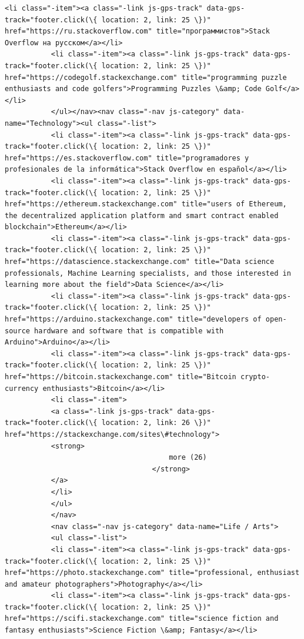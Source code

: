\documentclass[11pt]{article}
\begin{document}
\begin{Verbatim}[commandchars=\\\{\}]
           <li class="-item"><a class="-link js-gps-track" data-gps-track="footer.click(\{ location: 2, link: 25 \})" href="https://ru.stackoverflow.com" title="программистов">Stack Overflow на русском</a></li>
           <li class="-item"><a class="-link js-gps-track" data-gps-track="footer.click(\{ location: 2, link: 25 \})" href="https://codegolf.stackexchange.com" title="programming puzzle enthusiasts and code golfers">Programming Puzzles \&amp; Code Golf</a></li>
           </ul></nav><nav class="-nav js-category" data-name="Technology"><ul class="-list">
           <li class="-item"><a class="-link js-gps-track" data-gps-track="footer.click(\{ location: 2, link: 25 \})" href="https://es.stackoverflow.com" title="programadores y profesionales de la informática">Stack Overflow en español</a></li>
           <li class="-item"><a class="-link js-gps-track" data-gps-track="footer.click(\{ location: 2, link: 25 \})" href="https://ethereum.stackexchange.com" title="users of Ethereum, the decentralized application platform and smart contract enabled blockchain">Ethereum</a></li>
           <li class="-item"><a class="-link js-gps-track" data-gps-track="footer.click(\{ location: 2, link: 25 \})" href="https://datascience.stackexchange.com" title="Data science professionals, Machine Learning specialists, and those interested in learning more about the field">Data Science</a></li>
           <li class="-item"><a class="-link js-gps-track" data-gps-track="footer.click(\{ location: 2, link: 25 \})" href="https://arduino.stackexchange.com" title="developers of open-source hardware and software that is compatible with Arduino">Arduino</a></li>
           <li class="-item"><a class="-link js-gps-track" data-gps-track="footer.click(\{ location: 2, link: 25 \})" href="https://bitcoin.stackexchange.com" title="Bitcoin crypto-currency enthusiasts">Bitcoin</a></li>
           <li class="-item">
           <a class="-link js-gps-track" data-gps-track="footer.click(\{ location: 2, link: 26 \})" href="https://stackexchange.com/sites\#technology">
           <strong>
                                       more (26)
                                   </strong>
           </a>
           </li>
           </ul>
           </nav>
           <nav class="-nav js-category" data-name="Life / Arts">
           <ul class="-list">
           <li class="-item"><a class="-link js-gps-track" data-gps-track="footer.click(\{ location: 2, link: 25 \})" href="https://photo.stackexchange.com" title="professional, enthusiast and amateur photographers">Photography</a></li>
           <li class="-item"><a class="-link js-gps-track" data-gps-track="footer.click(\{ location: 2, link: 25 \})" href="https://scifi.stackexchange.com" title="science fiction and fantasy enthusiasts">Science Fiction \&amp; Fantasy</a></li>

\end{Verbatim}
\end{document}
